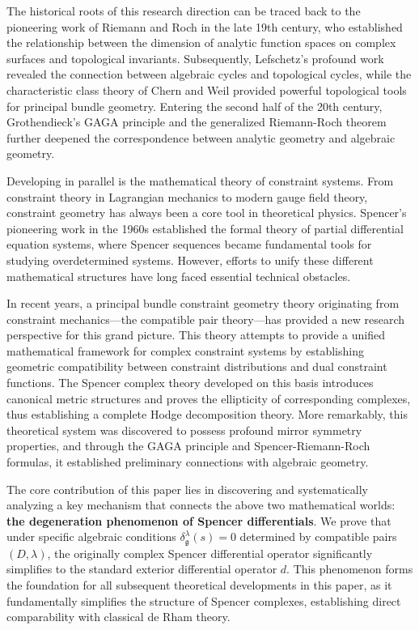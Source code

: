 \documentclass[a4paper,12pt]{extarticle}
\theoremstyle{plain}
\theoremstyle{definition}
\begin{document}
The historical roots of this research direction can be traced back to the pioneering work of Riemann and Roch in the late 19th century\cite{Riemann1857}, who established the relationship between the dimension of analytic function spaces on complex surfaces and topological invariants. Subsequently, Lefschetz's profound work\cite{Lefschetz1924} revealed the connection between algebraic cycles and topological cycles, while the characteristic class theory of Chern and Weil\cite{ChernWeil1944} provided powerful topological tools for principal bundle geometry. Entering the second half of the 20th century, Grothendieck's GAGA principle\cite{Serre1956, Grothendieck1961} and the generalized Riemann-Roch theorem\cite{BorelSerre1958, AtiyahSinger1963} further deepened the correspondence between analytic geometry and algebraic geometry.

Developing in parallel is the mathematical theory of constraint systems. From constraint theory in Lagrangian mechanics\cite{ArnoldMarsden1978} to modern gauge field theory\cite{YangMills1954}, constraint geometry has always been a core tool in theoretical physics. Spencer's pioneering work in the 1960s\cite{Spencer1962, SpencerQuillian1963} established the formal theory of partial differential equation systems, where Spencer sequences became fundamental tools for studying overdetermined systems. However, efforts to unify these different mathematical structures have long faced essential technical obstacles.

In recent years, a principal bundle constraint geometry theory originating from constraint mechanics—the compatible pair theory\cite{zheng2025dynamical}—has provided a new research perspective for this grand picture. This theory attempts to provide a unified mathematical framework for complex constraint systems by establishing geometric compatibility between constraint distributions and dual constraint functions. The Spencer complex theory developed on this basis\cite{zheng2025constructing} introduces canonical metric structures and proves the ellipticity of corresponding complexes, thus establishing a complete Hodge decomposition theory. More remarkably, this theoretical system was discovered to possess profound mirror symmetry properties\cite{zheng2025mirror}, and through the GAGA principle and Spencer-Riemann-Roch formulas\cite{zheng2025spencer-riemann-roch, zheng2025analytic}, it established preliminary connections with algebraic geometry.

The core contribution of this paper lies in discovering and systematically analyzing a key mechanism that connects the above two mathematical worlds: \textbf{the degeneration phenomenon of Spencer differentials}. We prove that under specific algebraic conditions $\delta_{\mathfrak{g}}^{\lambda}(s)=0$ determined by compatible pairs $(D,\lambda)$, the originally complex Spencer differential operator significantly simplifies to the standard exterior differential operator $d$. This phenomenon forms the foundation for all subsequent theoretical developments in this paper, as it fundamentally simplifies the structure of Spencer complexes, establishing direct comparability with classical de Rham theory\cite{deRham1931, deRham1955}.
\end{document}
